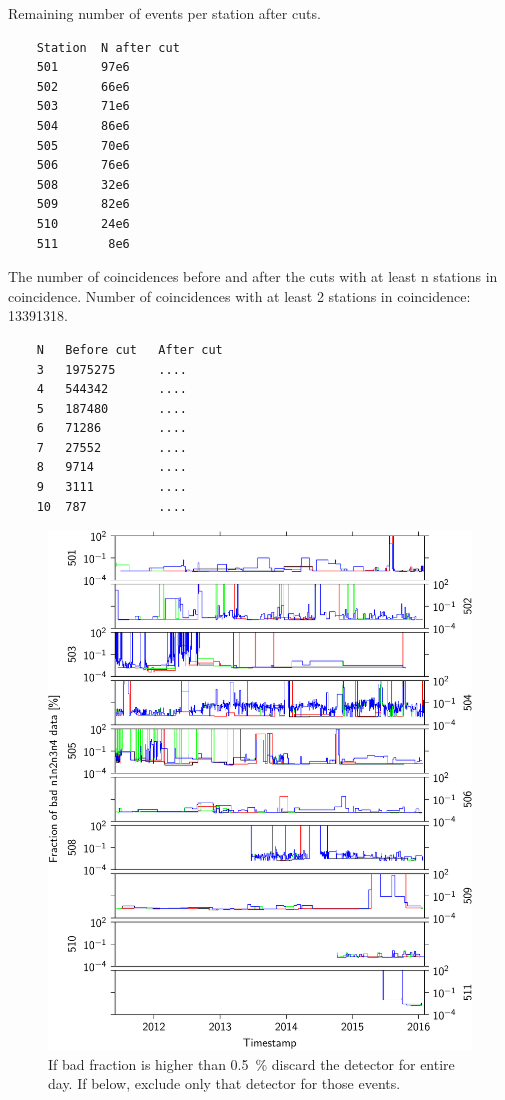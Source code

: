 Remaining number of events per station after cuts.

\begin{verbatim}
    Station  N after cut
    501      97e6
    502      66e6
    503      71e6
    504      86e6
    505      70e6
    506      76e6
    508      32e6
    509      82e6
    510      24e6
    511       8e6
\end{verbatim}

The number of coincidences before and after the cuts with at least n stations in coincidence. Number of coincidences with at least 2 stations in coincidence: 13391318.

\begin{verbatim}
    N   Before cut   After cut
    3   1975275      ....
    4   544342       ....
    5   187480       ....
    6   71286        ....
    7   27552        ....
    8   9714         ....
    9   3111         ....
    10  787          ....
\end{verbatim}

\begin{figure}
    \centering
    \includegraphics[width=0.7\linewidth]{plots/dataset/bad_fraction_n1n2n3n4.pdf}
    \caption{If bad fraction is higher than \SI{.5}{\percent} discard the detector for entire day. If below, exclude only that detector for those events.}
    \label{fig:bad_n}
\end{figure}
